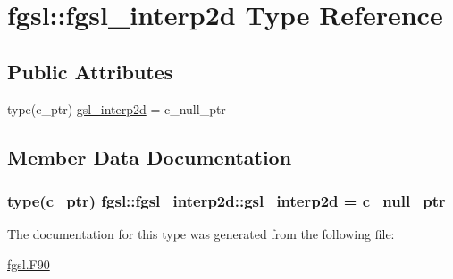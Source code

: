 \hypertarget{structfgsl_1_1fgsl__interp2d}{}\section{fgsl\+:\+:fgsl\+\_\+interp2d Type Reference}
\label{structfgsl_1_1fgsl__interp2d}
\subsection*{Public Attributes}
\begin{DoxyCompactItemize}
\item 
type(c\+\_\+ptr) \hyperlink{structfgsl_1_1fgsl__interp2d_aad0b01372317804eafcdbd0c35a99ef0}{gsl\+\_\+interp2d} = c\+\_\+null\+\_\+ptr
\end{DoxyCompactItemize}


\subsection{Member Data Documentation}
\hypertarget{structfgsl_1_1fgsl__interp2d_aad0b01372317804eafcdbd0c35a99ef0}{}
\subsubsection[{gsl\+\_\+interp2d}]{\setlength{\rightskip}{0pt plus 5cm}type(c\+\_\+ptr) fgsl\+::fgsl\+\_\+interp2d\+::gsl\+\_\+interp2d = c\+\_\+null\+\_\+ptr}\label{structfgsl_1_1fgsl__interp2d_aad0b01372317804eafcdbd0c35a99ef0}


The documentation for this type was generated from the following file\+:\begin{DoxyCompactItemize}
\item 
\hyperlink{fgsl_8F90}{fgsl.\+F90}\end{DoxyCompactItemize}
